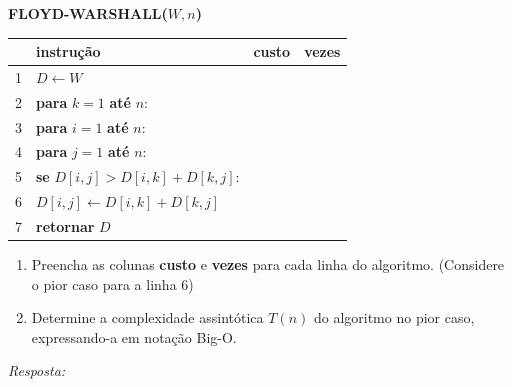 \documentclass[12pt,a4paper]{article}
\newcommand{\quadro}[1]{\vspace{0.2cm}\begin{tcolorbox}[colback=white, colframe=black, height=#1, boxrule=0.5pt, arc=0pt] \textit{Resposta:} \end{tcolorbox}}
\begin{document}
\begin{enumerate}
    \begin{tcolorbox}[colback=white, colframe=black, fontupper=\small]
        \textbf{FLOYD-WARSHALL($W, n$)} \\
        \begin{tabular}{llcc}
            \hline
            & \textbf{instrução} & \textbf{custo} & \textbf{vezes} \\
            \hline
            1 & $D \leftarrow W$ & \underline{\hspace{1cm}} & \underline{\hspace{1cm}} \\
            2 & \textbf{para} $k = 1$ \textbf{até} $n$: & \underline{\hspace{1cm}} & \underline{\hspace{1cm}} \\
            3 & \quad \textbf{para} $i = 1$ \textbf{até} $n$: & \underline{\hspace{1cm}} & \underline{\hspace{1cm}} \\
            4 & \quad \quad \textbf{para} $j = 1$ \textbf{até} $n$: & \underline{\hspace{1cm}} & \underline{\hspace{1cm}} \\
            5 & \quad \quad \quad \textbf{se} $D[i,j] > D[i,k] + D[k,j]$: & \underline{\hspace{1cm}} & \underline{\hspace{1cm}} \\
            6 & \quad \quad \quad \quad $D[i,j] \leftarrow D[i,k] + D[k,j]$ & \underline{\hspace{1cm}} & \underline{\hspace{1cm}} \\
            7 & \textbf{retornar} $D$ & \underline{\hspace{1cm}} & \underline{\hspace{1cm}} \\
            \hline
        \end{tabular}
    \end{tcolorbox}

    \begin{enumerate}[label=\alph*)]
        \item Preencha as colunas \textbf{custo} e \textbf{vezes} para cada linha do algoritmo. (Considere o pior caso para a linha 6)
        \item Determine a complexidade assintótica $T(n)$ do algoritmo no pior caso, expressando-a em notação Big-O.
    \end{enumerate}
    \quadro{6cm}


\end{enumerate}
\end{document}
